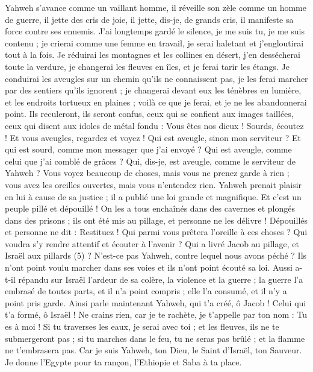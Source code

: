 \begin{multicols}{2}
{Yahweh s’avance comme un vaillant homme, il réveille son zèle comme un homme de guerre, il jette des cris de joie, il jette, dis-je, de grands cris, il manifeste sa force contre ses ennemis.
J’ai longtemps gardé le silence, je me suis tu, je me suis contenu ; je crierai comme une femme en travail, je serai haletant et j'engloutirai tout à la fois.
Je réduirai les montagnes et les collines en désert, j’en dessécherai toute la verdure, je changerai les fleuves en îles, et je ferai tarir les étangs.
Je conduirai les aveugles sur un chemin qu’ils ne connaissent pas, je les ferai marcher par des sentiers qu'ils ignorent ; je changerai devant eux les ténèbres en lumière, et les endroits tortueux en plaines ; voilà ce que je ferai, et je ne les abandonnerai point.
Ils reculeront, ils seront confus, ceux qui se confient aux images taillées, ceux qui disent aux idoles de métal fondu : Vous êtes nos dieux !
Sourds, écoutez ! Et vous aveugles, regardez et voyez !
Qui est aveugle, sinon mon serviteur ? Et qui est sourd, comme mon messager que j'ai envoyé ? Qui est aveugle, comme celui que j'ai comblé de grâces ? Qui, dis-je, est aveugle, comme le serviteur de Yahweh ?
Vous voyez beaucoup de choses, mais vous ne prenez garde à rien ; vous avez les oreilles ouvertes, mais vous n'entendez rien.
Yahweh prenait plaisir en lui à cause de sa justice ; il a publié une loi grande et magnifique.
Et c’est un peuple pillé et dépouillé ! On les a tous enchaînés dans des cavernes et plongés dans des prisons ; ils ont été mis au pillage, et personne ne les délivre ! Dépouillés et personne ne dit : Restituez !
Qui parmi vous prêtera l'oreille à ces choses ? Qui voudra s’y rendre attentif et écouter à l’avenir ?
Qui a livré Jacob au pillage, et Israël aux pillards (5) ? N'est-ce pas Yahweh, contre lequel nous avons péché ? Ils n’ont point voulu marcher dans ses voies et ils n’ont point écouté sa loi.
Aussi a-t-il répandu sur Israël l’ardeur de sa colère, la violence et la guerre ; la guerre l’a embrasé de toutes parts, et il n’a point compris ; elle l’a consumé, et il n’y a point pris garde.
\VerseOne{}Ainsi parle maintenant Yahweh, qui t'a créé, ô Jacob ! Celui qui t'a formé, ô Israël ! Ne crains rien, car je te rachète, je t’appelle par ton nom : Tu es à moi !
Si tu traverses les eaux, je serai avec toi ; et les fleuves, ils ne te submergeront pas ; si tu marches dans le feu, tu ne seras pas brûlé ; et la flamme ne t'embrasera pas.
Car je suis Yahweh, ton Dieu, le Saint d'Israël, ton Sauveur. Je donne l'Egypte pour ta rançon, l’Ethiopie et Saba à ta place.
}
\end{multicols}
